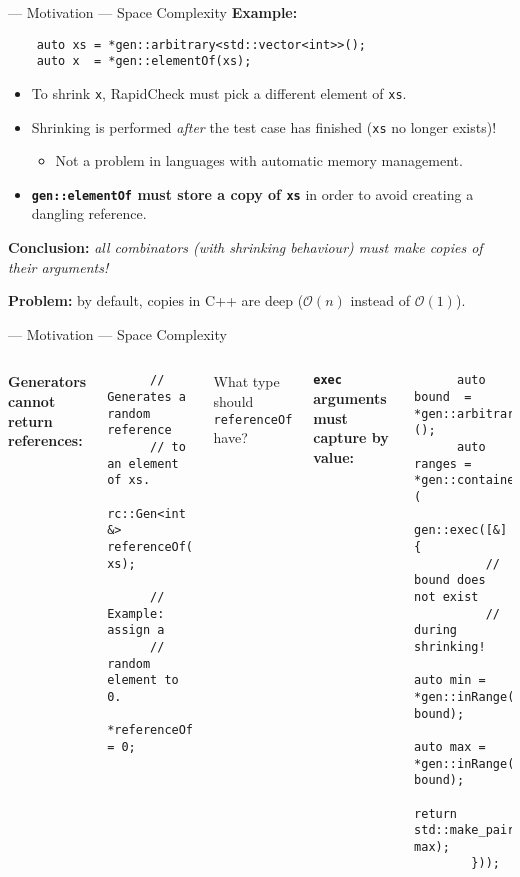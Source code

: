 \begin{frame}[fragile]{\halcheck{} --- Motivation --- Space Complexity}
  \textbf{Example:}
  \begin{verbatim}
    auto xs = *gen::arbitrary<std::vector<int>>();
    auto x  = *gen::elementOf(xs);
  \end{verbatim}

  \pause{}

  \begin{itemize}
    \item To shrink \texttt{x}, RapidCheck must pick a different element of \texttt{xs}.
          \pause{}

    \item Shrinking is performed \emph{after} the test case has finished (\texttt{xs} no longer exists)!
          \begin{itemize}
            \item Not a problem in languages with automatic memory management.
          \end{itemize}
          \pause{}

    \item \textbf{\texttt{gen::elementOf} must store a copy of \texttt{xs}} in order to avoid creating a dangling reference.
          \pause{}
  \end{itemize}

  \textbf{Conclusion:} \textit{all combinators (with shrinking behaviour) must make copies of their arguments!}

  \textbf{Problem:} by default, copies in C++ are deep ($\mathcal{O}(n)$ instead of $\mathcal{O}(1)$).
\end{frame}

\begin{frame}[fragile]{\halcheck{} --- Motivation --- Space Complexity}
  \begin{columns}[t]
    \textbf{Generators cannot return references:}

    \begin{verbatim}
      // Generates a random reference
      // to an element of xs.
      rc::Gen<int &> referenceOf(??? xs);

      // Example: assign a
      // random element to 0.
      *referenceOf(xs) = 0;
    \end{verbatim}

    What type should \texttt{referenceOf} have?

    \pause{}

    \textbf{\texttt{exec} arguments must capture by value:}
    \begin{verbatim}
      auto bound  = *gen::arbitrary<int>();
      auto ranges = *gen::container<...>(
        gen::exec([&] {
          // bound does not exist
          // during shrinking!
          auto min = *gen::inRange(0, bound);
          auto max = *gen::inRange(min, bound);
          return std::make_pair(min, max);
        }));
    \end{verbatim}
  \end{columns}
\end{frame}

